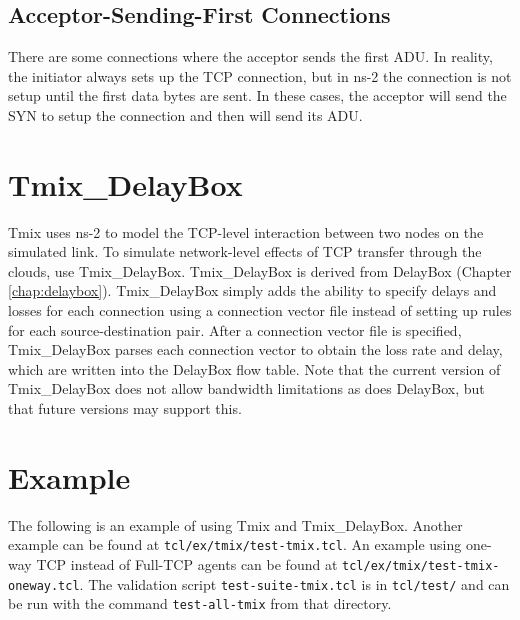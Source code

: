 \subsection{Acceptor-Sending-First Connections}
There are some connections where the acceptor sends the first ADU\@.  In reality, the initiator always sets up the TCP connection, but in ns-2 the connection is not setup until the first data bytes are sent.  In these cases, the acceptor will send the SYN to setup the connection and then will send its ADU\@.

\section{Tmix\_DelayBox}
\label{sec:tmix-db}

Tmix uses ns-2 to model the TCP-level interaction between two nodes on
the simulated link. To simulate network-level effects of TCP transfer
through the clouds, use Tmix\_DelayBox. Tmix\_DelayBox is derived from
DelayBox (Chapter \ref{chap:delaybox}).  Tmix\_DelayBox simply adds
the ability to specify delays and losses for each connection using a
connection vector file instead of setting up rules for each
source-destination pair.  After a connection vector file is specified,
Tmix\_DelayBox parses each connection vector to obtain the loss rate and
delay, which are written into the DelayBox flow table.  Note that the current version of Tmix\_DelayBox does not allow bandwidth limitations as does DelayBox, but that future versions may support this.

\section{Example}
The following is an example of using Tmix and Tmix\_DelayBox.  Another example can be found at {\tt tcl/ex/tmix/test-tmix.tcl}.  An example using one-way TCP instead of Full-TCP agents can be found at {\tt tcl/ex/tmix/test-tmix-oneway.tcl}.  The
validation script {\tt test-suite-tmix.tcl} is in {\tt tcl/test/} and
can be run with the command {\tt test-all-tmix} from that directory.

